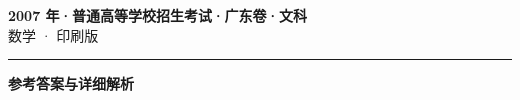\documentclass[zihao=5, a4paper]{ctexart}
\begin{document}
\begin{center}
  {\Large\bfseries 2007 年·普通高等学校招生考试·广东卷·文科}\\[4pt]
  {\large 数学 · 印刷版}
\end{center}
\medskip
{}

\par\bigskip\hrule\bigskip
{}
\begin{center}{\large\bfseries 参考答案与详细解析}\end{center}
\smallskip

\end{document}
